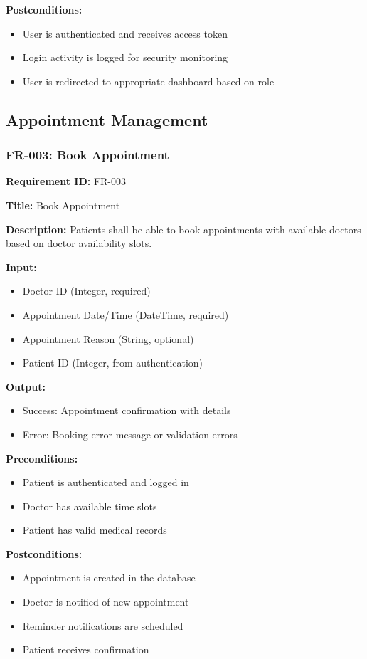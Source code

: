 \documentclass[12pt,a4paper]{article}
\begin{document}
\textbf{Postconditions:}
\begin{itemize}
    \item User is authenticated and receives access token
    \item Login activity is logged for security monitoring
    \item User is redirected to appropriate dashboard based on role
\end{itemize}

\subsection{Appointment Management}

\subsubsection{FR-003: Book Appointment}

\textbf{Requirement ID:} FR-003

\textbf{Title:} Book Appointment

\textbf{Description:} Patients shall be able to book appointments with available doctors based on doctor availability slots.

\textbf{Input:}
\begin{itemize}
    \item Doctor ID (Integer, required)
    \item Appointment Date/Time (DateTime, required)
    \item Appointment Reason (String, optional)
    \item Patient ID (Integer, from authentication)
\end{itemize}

\textbf{Output:}
\begin{itemize}
    \item Success: Appointment confirmation with details
    \item Error: Booking error message or validation errors
\end{itemize}

\textbf{Preconditions:}
\begin{itemize}
    \item Patient is authenticated and logged in
    \item Doctor has available time slots
    \item Patient has valid medical records
\end{itemize}

\textbf{Postconditions:}
\begin{itemize}
    \item Appointment is created in the database
    \item Doctor is notified of new appointment
    \item Reminder notifications are scheduled
    \item Patient receives confirmation
\end{itemize}
\end{document}
